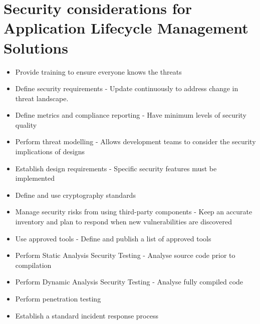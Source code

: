 \documentclass{article}[18pt]
\begin{document}
\section{Security considerations for Application Lifecycle Management Solutions}
\begin{itemize}
	\item Provide training to ensure everyone knows the threats
	\item Define security requirements - Update continuously to address change in threat landscape. 
	\item Define metrics and compliance reporting - Have minimum levels of security quality
	\item Perform threat modelling - Allows development teams to consider the security implications of designs
	\item Establish design requirements - Specific security features must be implemented
	\item Define and use cryptography standards
	\item Manage security risks from using third-party components - Keep an accurate inventory and plan to respond when new vulnerabilities are discovered
	\item Use approved tools - Define and publish a list of approved tools
	\item Perform Static Analysis Security Testing - Analyse source code prior to compilation
	\item Perform Dynamic Analysis Security Testing - Analyse fully compiled code
	\item Perform penetration testing
	\item Establish a standard incident response process
\end{itemize}
\end{document}
